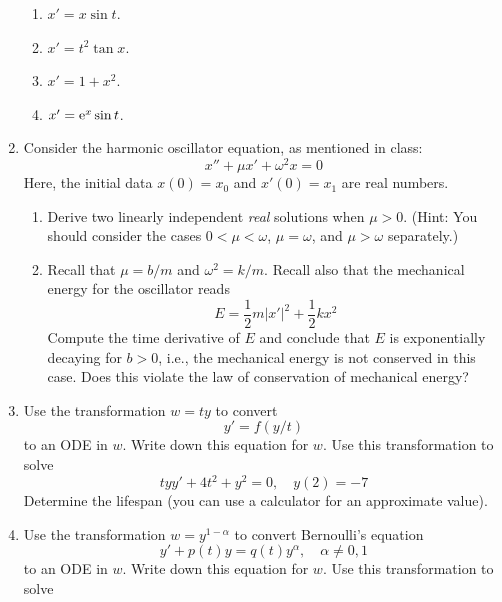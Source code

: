 \documentclass[../psets.tex]{subfiles}
\begin{document}
\begin{enumerate}
\begin{enumerate}
        \item $x'=x\sin t$.
        \item $x'=t^2\tan x$.
        \item $x'=1+x^2$.
        \item $x'=\e[x]\sin t$.
    \end{enumerate}
    \item Consider the harmonic oscillator equation, as mentioned in class:
    \begin{equation*}
        x''+\mu x'+\omega^2x = 0
    \end{equation*}
    Here, the initial data $x(0)=x_0$ and $x'(0)=x_1$ are real numbers.
    \begin{enumerate}
        \item Derive two linearly independent \emph{real} solutions when $\mu>0$. (Hint: You should consider the cases $0<\mu<\omega$, $\mu=\omega$, and $\mu>\omega$ separately.)
        \item Recall that $\mu=b/m$ and $\omega^2=k/m$. Recall also that the mechanical energy for the oscillator reads
        \begin{equation*}
            E = \frac{1}{2}m|x'|^2+\frac{1}{2}kx^2
        \end{equation*}
        Compute the time derivative of $E$ and conclude that $E$ is exponentially decaying for $b>0$, i.e., the mechanical energy is not conserved in this case. Does this violate the law of conservation of mechanical energy?
    \end{enumerate}
    \item Use the transformation $w=ty$ to convert
    \begin{equation*}
        y' = f(y/t)
    \end{equation*}
    to an ODE in $w$. Write down this equation for $w$. Use this transformation to solve
    \begin{equation*}
        tyy'+4t^2+y^2 = 0
        ,\quad
        y(2) = -7
    \end{equation*}
    Determine the lifespan (you can use a calculator for an approximate value).
    \item Use the transformation $w=y^{1-\alpha}$ to convert Bernoulli's equation
    \begin{equation*}
        y'+p(t)y = q(t)y^\alpha
        ,\quad
        \alpha\neq 0,1
    \end{equation*}
    to an ODE in $w$. Write down this equation for $w$. Use this transformation to solve
    \begin{equation*}

\end{equation*}
\end{enumerate}
\end{document}
